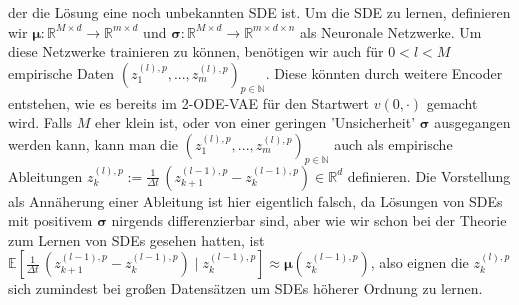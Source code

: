 \documentclass[12pt]{article}
\newcommand{\E}{\mathbb{E}}
\newcommand{\R}{\mathbb{R}}
\newcommand{\bmu}{\bm{\mu}}
\newcommand{\bsig}{\bm{\sigma}}
\newcommand{\N}{\mathbb{N}}
\begin{document}
	der die Lösung eine noch unbekannten SDE ist. Um die SDE zu lernen, definieren wir $\bmu : \R^{M \times d} \rightarrow \R^{m \times d}$ und $\bsig: \R^{M \times d} \rightarrow \R^{m \times d \times n}$ als Neuronale Netzwerke. Um diese Netzwerke trainieren zu können, benötigen wir auch für $0<l<M$ empirische Daten $(z_1^{(l),p},...,z_m^{(l),p})_{p \in \N}$. Diese könnten durch weitere Encoder entstehen, wie es bereits im 2-ODE-VAE für den Startwert $v(0,\cdot)$ gemacht wird. Falls $M$ eher klein ist, oder von einer geringen 'Unsicherheit' $\bsig$ ausgegangen werden kann, kann man die $(z_1^{(l),p},...,z_m^{(l),p})_{p \in \N}$ auch als empirische Ableitungen $z_k^{(l),p} := \frac{1}{\Delta t} \, (z_{k+1}^{(l-1),p} - z_k^{(l-1),p}) \in \R^d$ definieren. Die Vorstellung als Annäherung einer Ableitung ist hier eigentlich falsch, da Lösungen von SDEs mit positivem $\bsig$ nirgends differenzierbar sind, aber wie wir schon bei der Theorie zum Lernen von SDEs gesehen hatten, ist $\E[\frac{1}{\Delta t} \, (z_{k+1}^{(l-1),p} - z_k^{(l-1),p}) \mid z_k^{(l-1),p}] \approx \bmu(z_k^{(l-1),p})$, also eignen die $z_k^{(l),p}$ sich zumindest bei großen Datensätzen um SDEs höherer Ordnung zu lernen.
	
	\newpage
	\noindent
	
\end{document}
